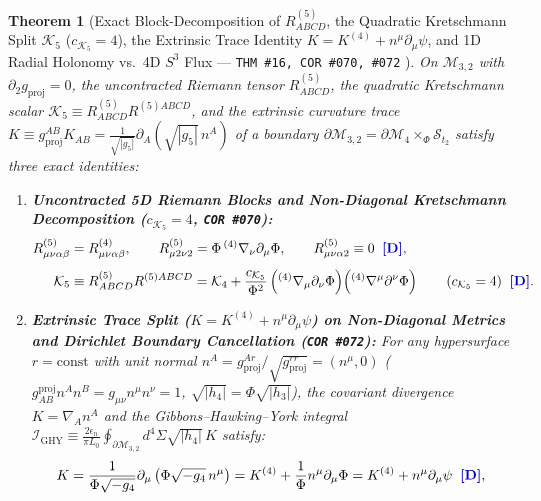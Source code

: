 \documentclass[11pt,a4paper]{article}
\newcommand{\catD}{\text{\textbf{\textcolor{blue!75!black}{[D]}}}}
\theoremstyle{definition}
\theoremstyle{plain}
\newtheorem{theorem}[axiom]{Theorem}
\theoremstyle{remark}
\begin{document}
\begin{theorem}[{Exact Block-Decomposition of $R^{(5)}_{ABCD}$, the Quadratic Kretschmann Split $\mathcal{K}_5$ ($c_{\mathcal{K}_5} = 4$), the Extrinsic Trace Identity $K = K^{(4)} + n^\mu\partial_\mu\psi$, and 1D Radial Holonomy vs.\ 4D $S^3$ Flux --- \texttt{THM~\#16, COR~\#070, \#072} \catD}]\label{thm:c4_kretschmann_ghy_identities}
On $\mathcal{M}_{3,2}$ with $\partial_2 g_{\mathrm{proj}} = 0$, the uncontracted Riemann tensor $R^{(5)}_{ABCD}$, the quadratic Kretschmann scalar $\mathcal{K}_5 \equiv R^{(5)}_{ABCD}R^{(5)ABCD}$, and the extrinsic curvature trace $K \equiv g_{\mathrm{proj}}^{AB}K_{AB} = \frac{1}{\sqrt{|g_5|}}\partial_A(\sqrt{|g_5|}\,n^A)$ of a boundary $\partial\mathcal{M}_{3,2} = \partial\mathcal{M}_4 \times_\Phi \mathcal{S}_{t_2}$ satisfy three exact identities:
\begin{enumerate}[label=(\roman*)]
  \item \textbf{Uncontracted 5D Riemann Blocks and Non-Diagonal Kretschmann Decomposition ($c_{\mathcal{K}_5} = 4$, \texttt{COR~\#070}):}
  \begin{align}
  R^{(5)}_{\mu\nu\alpha\beta} &= R^{(4)}_{\mu\nu\alpha\beta}, \qquad
  R^{(5)}_{\mu 2\nu 2} = \Phi\,{}^{(4)}\nabla_\nu\partial_\mu\Phi, \qquad
  R^{(5)}_{\mu\nu\alpha 2} \equiv 0 \;\;\catD, \label{eq:c4_riemann_blocks} \\[4pt]
  \mathcal{K}_5 &\equiv R^{(5)}_{ABCD}R^{(5)ABCD} = \mathcal{K}_4 + \frac{c_{\mathcal{K}_5}}{\Phi^2}\left({}^{(4)}\nabla_\mu\partial_\nu\Phi\right)\!\left({}^{(4)}\nabla^\mu\partial^\nu\Phi\right) \qquad (c_{\mathcal{K}_5} = 4) \;\;\catD. \label{eq:c4_kretschmann_split}
  \end{align}
  \item \textbf{Extrinsic Trace Split ($K = K^{(4)} + n^\mu\partial_\mu\psi$) on Non-Diagonal Metrics and Dirichlet Boundary Cancellation (\texttt{COR~\#072}):}
  For any hypersurface $r = \mathrm{const}$ with unit normal $n^A = g_{\mathrm{proj}}^{Ar}/\sqrt{g_{\mathrm{proj}}^{rr}} = (n^\mu, 0)$ ($g_{AB}^{\mathrm{proj}}n^A n^B = g_{\mu\nu}n^\mu n^\nu = 1$, $\sqrt{|h_4|} = \Phi\sqrt{|h_3|}$), the covariant divergence $K = \nabla_A n^A$ and the Gibbons--Hawking--York integral $\mathcal{I}_{\mathrm{GHY}} \equiv \frac{2\epsilon_n}{\pi L_0}\oint_{\partial\mathcal{M}_{3,2}} d^4\Sigma\sqrt{|h_4|}\,K$ satisfy:
  \begin{align}
  K &= \frac{1}{\Phi\sqrt{-g_4}}\partial_\mu\left(\Phi\sqrt{-g_4}\,n^\mu\right) = K^{(4)} + \frac{1}{\Phi}n^\mu\partial_\mu\Phi = K^{(4)} + n^\mu\partial_\mu\psi \;\;\catD, \label{eq:c4_extrinsic_trace_split} \\[4pt]

\end{align}
\end{enumerate}
\end{theorem}
\end{document}

